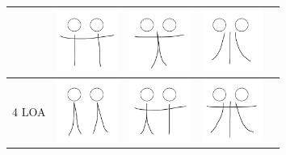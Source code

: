 {\begin{table}[!htb]
\begin{tabular}{ | c | c || c | c | c | }
\begin{minipage}{.15\textwidth}
    \end{minipage}
    &
    \begin{minipage}{.15\textwidth}
      \includegraphics[width=\linewidth, height=20mm]{img/04keyframe}
    \end{minipage}
    &
    \begin{minipage}{.15\textwidth}
      \includegraphics[width=\linewidth, height=20mm]{img/05keyframe}
    \end{minipage} 
    & 
    \begin{minipage}{.15\textwidth}
      \includegraphics[width=\linewidth, height=20mm]{img/06keyframe}
    \end{minipage} 
    \\ \hline
    4 LOA 
    &
    \begin{minipage}{.15\textwidth}
      \includegraphics[width=\linewidth, height=20mm]{img/4loa_separate_keyframe}
    \end{minipage}
    &
    \begin{minipage}{.15\textwidth}
      \includegraphics[width=\linewidth, height=20mm]{img/07keyframe}
    \end{minipage}
    &
    \begin{minipage}{.15\textwidth}
      \includegraphics[width=\linewidth, height=20mm]{img/08keyframe}

\end{minipage}
\end{tabular}
\end{table}}
